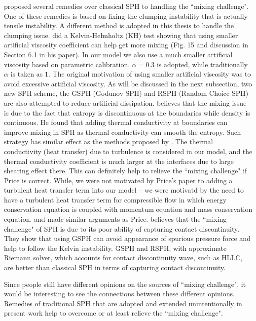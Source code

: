 \citet{read2010resolving} proposed several remedies over classical SPH to handling the ``mixing challenge". One of these remedies is based on fixing the clumping instability that is actually tensile instability. A different method \citep{chen1999improvement} is adopted in this thesis to handle the clumping issue. \citet{agertz2007fundamental} did a Kelvin-Helmholtz (KH) test showing that using smaller artificial viscosity coefficient can help get more mixing (Fig. 15 and discussion in Section 6.1 in his paper). In our model we also use a much smaller artificial viscosity based on parametric calibration. $\alpha =0.3$ is adopted, while traditionally $\alpha$ is taken as $1$. The original motivation of using smaller artificial viscosity was to avoid excessive artificial viscosity. As will be discussed in the next subsection, two new SPH scheme, the GSPH (Godunov SPH) and RSPH (Random Choice SPH) are also attempted to reduce artificial dissipation. \citet{price2008modelling} believes that the mixing issue is due to the fact that entropy is discontinuous at the boundaries while density is continuous. He found that adding thermal conductivity at boundaries can improve mixing in SPH as thermal conductivity can smooth the entropy. Such strategy has similar effect as the methods proposed by \citet{read2010resolving}. The thermal conductivity (heat transfer) due to turbulence is considered in our model, and the thermal conductivity coefficient is much larger at the interfaces due to large shearing effect there. This can definitely help to relieve the ``mixing challenge" if Price is correct. While, we were not motivated by Price's paper to adding a turbulent heat transfer term into our model -- we were motivatd by the need to have a turbulent heat transfer term for compressible flow in which energy conservation equation is coupled with momentum equation and mass conservation equation.
\citet{wadsley2008treatment} and \citet{ritchie2001multiphase} made similar arguments as Price. \citet{borgani2012hydrodynamic} believes that the ``mixing challenge" of SPH is due to its poor ability of capturing contact discontinuity. They show that using GSPH can avoid appearance of spurious pressure force and help to follow the Kelvin instability. GSPH and RSPH, with approximate Riemann solver, which accounts for contact discontinuity wave, such as HLLC, are better than classical SPH in terms of capturing contact discontinuity.

Since people still have different opinions on the sources of ``mixing challenge", it would be interesting to see the connections between these different opinions. Remedies of traditional SPH that are adopted and extended unintentionally in present work help to overcome or at least relieve the ``mixing challenge".


